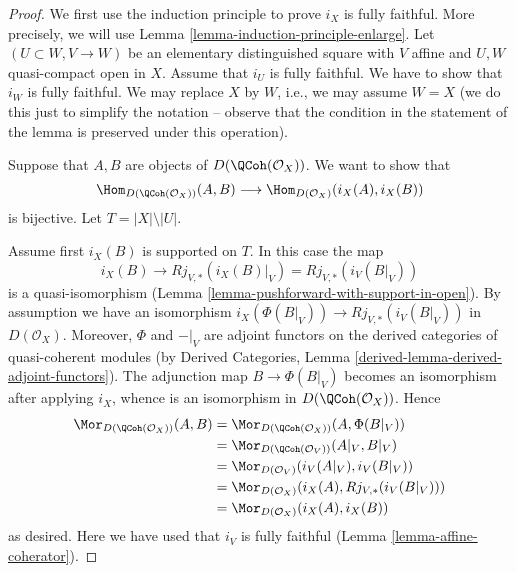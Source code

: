 \begin{proof}
We first use the induction principle to prove $i_X$ is fully faithful.
More precisely, we will use Lemma \ref{lemma-induction-principle-enlarge}.
Let $(U \subset W, V \to W)$ be an elementary distinguished square
with $V$ affine and $U, W$ quasi-compact open in $X$. Assume that
$i_U$ is fully faithful. We have to show that $i_W$ is fully faithful.
We may replace $X$ by $W$, i.e., we may assume $W = X$ (we do this just
to simplify the notation -- observe that the condition in the
statement of the lemma is preserved under this operation).

\medskip\noindent
Suppose that $A, B$ are objects of $D(\QCoh(\mathcal{O}_X))$.
We want to show that
$$
\Hom_{D(\QCoh(\mathcal{O}_X))}(A, B)
\longrightarrow
\Hom_{D(\mathcal{O}_X)}(i_X(A), i_X(B))
$$
is bijective. Let $T = |X| \setminus |U|$.

\medskip\noindent
Assume first $i_X(B)$ is supported on $T$. In this case the map
$$
i_X(B) \to Rj_{V, *}(i_X(B)|_V) = Rj_{V, *}(i_V(B|_V))
$$
is a quasi-isomorphism
(Lemma \ref{lemma-pushforward-with-support-in-open}).
By assumption we have an isomorphism
$i_X(\Phi(B|_V)) \to Rj_{V, *}(i_V(B|_V))$ in $D(\mathcal{O}_X)$.
Moreover, $\Phi$ and ${-}|_V$ are adjoint functors on the derived categories of
quasi-coherent modules (by
Derived Categories, Lemma \ref{derived-lemma-derived-adjoint-functors}).
The adjunction map $B \to \Phi(B|_V)$ becomes an isomorphism
after applying $i_X$, whence is an isomorphism in
$D(\QCoh(\mathcal{O}_X))$.
Hence
\begin{align*}
\Mor_{D(\QCoh(\mathcal{O}_X))}(A, B)
& =
\Mor_{D(\QCoh(\mathcal{O}_X))}(A, \Phi(B|_V)) \\
& =
\Mor_{D(\QCoh(\mathcal{O}_V))}(A|_V, B|_V) \\
& =
\Mor_{D(\mathcal{O}_V)}(i_V(A|_V), i_V(B|_V)) \\
& =
\Mor_{D(\mathcal{O}_X)}(i_X(A), Rj_{V, *}(i_V(B|_V))) \\
& =
\Mor_{D(\mathcal{O}_X)}(i_X(A), i_X(B))
\end{align*}
as desired. Here we have used that $i_V$ is fully faithful
(Lemma \ref{lemma-affine-coherator}).


\end{proof}
